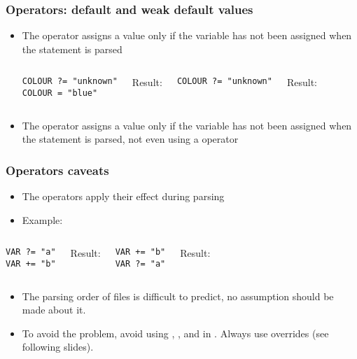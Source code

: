 \begin{frame}[fragile]
  \frametitle{Operators: default and weak default values}
  \begin{itemize}
  \item The  operator assigns a value only if the variable has not
    been assigned when the statement is parsed
  \begin{columns}
    \begin{block}{}
      \begin{verbatim}
COLOUR ?= "unknown"
COLOUR = "blue"
      \end{verbatim}
    \end{block}
    Result: 
    \break
    \begin{block}{}
      \begin{verbatim}
COLOUR ?= "unknown"
      \end{verbatim}
    \end{block}
     Result: 
    \break
  \end{columns}
  \item The  operator assigns a value only if the variable has
    not been assigned when the statement is parsed, not even using a
     operator
  \end{itemize}
\end{frame}

\begin{frame}[fragile]
  \frametitle{Operators caveats}
  \begin{itemize}
    \item The operators apply their effect during parsing
    \item Example:
  \end{itemize}
  \begin{columns}
    \begin{block}{}
      \begin{verbatim}
VAR ?= "a"
VAR += "b"
      \end{verbatim}
    \end{block}
    Result: 
    \break
    \begin{block}{}
      \begin{verbatim}
VAR += "b"
VAR ?= "a"
      \end{verbatim}
    \end{block}
    Result: 
    \break
  \end{columns}

  \begin{itemize}
    \item The parsing order of files is difficult to predict, no assumption
      should be made about it.
    \item To avoid the problem, avoid using \code{+=}, \code{=+}, 
      and  in . Always use
      overrides (see following slides).
  \end{itemize}
\end{frame}

